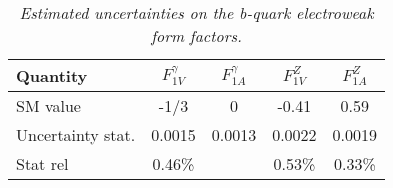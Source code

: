 \begin{table}
        \begin{center}
        \begin{tabular}{l c c c c}
        \hline
	Quantity  			& $F_{1V}^\gamma$ & $F_{1A}^\gamma$ &  $F_{1V}^Z$ &  $F_{1A}^Z$\\
	\hline
	SM value  			& -1/3   			& 0				  & -0.41		& 0.59\\
	Uncertainty stat.   & 0.0015   			& 0.0013		  & 0.0022 		& 0.0019\\
	Stat rel			& 0.46\%			& 				  & 0.53\%		& 0.33\%\\
        \hline
        \end{tabular}
        \end{center}
        \caption{\sl Estimated uncertainties on the b-quark electroweak form factors.}
        \label{table:fffinal}
\end{table}
